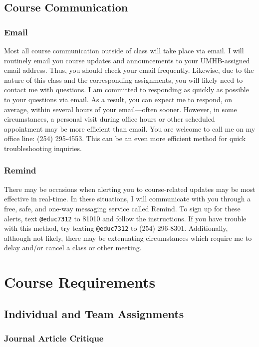 \documentclass[
]{article}
\begin{document}
\subsection{Course Communication}

\subsubsection{Email}

Most all course communication outside of class will take place via
email. I will routinely email you course updates and announcements to
your UMHB-assigned email address. Thus, you should check your email
frequently. Likewise, due to the nature of this class and the
corresponding assignments, you will likely need to contact me with
questions. I am committed to responding as quickly as possible to your
questions via email. As a result, you can expect me to respond, on
average, within several hours of your email---often sooner. However, in
some circumstances, a personal visit during office hours or other
scheduled appointment may be more efficient than email. You are welcome
to call me on my office line: (254) 295-4553. This can be an even more
efficient method for quick troubleshooting inquiries.

\subsubsection{Remind}

There may be occasions when alerting you to course-related updates may
be most effective in real-time. In these situations, I will communicate
with you through a free, safe, and one-way messaging service called
Remind. To sign up for these alerts, text \texttt{@educ7312} to 81010
and follow the instructions. If you have trouble with this method, try
texting \texttt{@educ7312} to (254) 296-8301. Additionally, although not
likely, there may be extenuating circumstances which require me to delay
and/or cancel a class or other meeting.

\section{Course Requirements}

\subsection{Individual and Team Assignments}

\subsubsection{Journal Article Critique}
\end{document}
